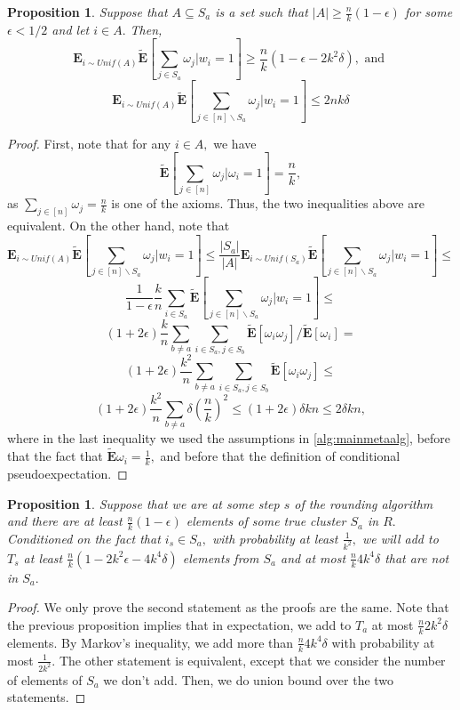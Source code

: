 \documentclass[12pt]{article}%
\newtheorem{proposition}[theorem]{Proposition}
\newcommand{\expect}{\mathbf{E}}
\newcommand{\pseudoexpect}{\tilde{\mathbf{E}}}
\begin{document}
\begin{proposition}
Suppose that $A\subseteq S_a$ is a set such that $|A|\ge \frac{n}{k}(1-\epsilon)$ for some $\epsilon<1/2$ and let $i\in A.$ Then,
$$
\expect_{i \sim Unif(A)}
\pseudoexpect [\sum_{j \in S_a}\omega_j|w_i= 1]\ge \frac{n}{k}(1- \epsilon - 2k^2\delta), \text{ and }
$$
$$
\expect_{i \sim Unif(A)}
\pseudoexpect [\sum_{j \in [n]\backslash S_a}\omega_j|w_i= 1]\le 2nk\delta
$$
\end{proposition}
\begin{proof}
First, note that for any $i \in A,$ we have
$$
\pseudoexpect[\sum_{j \in [n]}\omega_j |\omega_i = 1] = 
\frac{n}{k},
$$
as $\sum_{j \in [n]}\omega_j = \frac{n}{k}$ is one of the axioms. Thus, the two inequalities above are equivalent.
On the other hand, note that 
$$
\expect_{i \sim Unif(A)}
\pseudoexpect [\sum_{j \in [n]\backslash S_a}\omega_j|w_i= 1]\le 
\frac{|S_a|}{|A|}
\expect_{i \sim Unif(S_a)}
\pseudoexpect [\sum_{j \in [n]\backslash S_a}\omega_j|w_i= 1] \le 
$$
$$
\frac{1}{1-\epsilon} \frac{k}{n}
\sum_{i \in S_a}
\pseudoexpect [\sum_{j \in [n]\backslash S_a}\omega_j|w_i= 1] \le
$$
$$
(1 + 2\epsilon)\frac{k}{n}
\sum_{b \neq a}\sum_{i \in S_a, j \in S_b}
\pseudoexpect[\omega_i \omega_j]/\pseudoexpect[\omega_i] = 
$$
$$
(1 + 2\epsilon)\frac{k^2}{n}
\sum_{b \neq a}\sum_{i \in S_a, j \in S_b}
\pseudoexpect[\omega_i \omega_j]\le 
$$
$$
(1 + 2\epsilon)\frac{k^2}{n}
\sum_{b \neq a} \delta \left(\frac{n}{k}\right)^2 \le
(1 + 2\epsilon)\delta kn\le 
2\delta k n,
$$
where in the last inequality we used the assumptions in \cref{alg:mainmetaalg}, before that the fact that $\pseudoexpect \omega_i = \frac{1}{k},$ and before that the definition of conditional pseudoexpectation.\end{proof}

\noindent
\begin{proposition}
\label{prop:highprobversion}
Suppose that we are at some step $s$ of the rounding algorithm and there are at least $\frac{n}{k}(1-\epsilon)$ elements of some true cluster $S_a$ in $R.$ Conditioned on the fact that $i_s \in S_a,$ with probability at least $\frac{1}{k^2},$ we will add to $T_s$ at least $\frac{n}{k}(1 - 2k^2\epsilon - 
4k^4\delta
)$ elements from $S_a$ and at most 
$\frac{n}{k}4k^4\delta $ that are not in $S_a.$
\end{proposition}
\begin{proof}
We only prove the second statement as the proofs are the same. Note that the previous proposition implies that in expectation, we add to $T_a$ at most 
$\frac{n}{k}2 k^2\delta$ elements. By Markov's inequality, we add more than $\frac{n}{k}4k^4\delta$ with probability at most $\frac{1}{2k^2}.$ The other statement is equivalent, except that we consider the number of elements of $S_a$ we don't add. Then, we do union bound over the two statements.
\end{proof}
\end{document}
